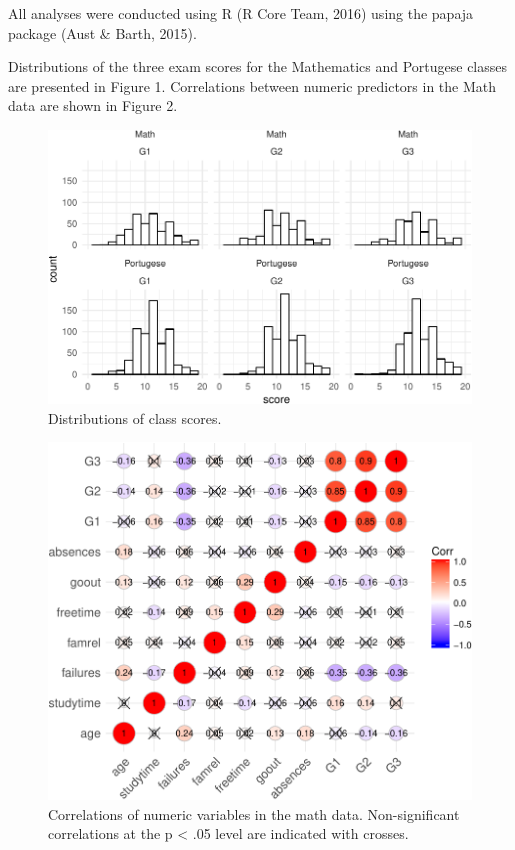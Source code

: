 \documentclass[english,floatsintext,man]{apa6}
\theoremstyle{definition}
\theoremstyle{definition}
\theoremstyle{definition}
\theoremstyle{remark}
\begin{document}
All analyses were conducted using R (R Core Team, 2016) using the papaja
package (Aust \& Barth, 2015).

Distributions of the three exam scores for the Mathematics and Portugese
classes are presented in Figure 1. Correlations between numeric
predictors in the Math data are shown in Figure 2.

\begin{figure}

{\centering \includegraphics[width=1\linewidth]{studentAPA_comp_files/figure-latex/fig1-1} 

}

\caption{Distributions of class scores.}\label{fig:fig1}
\end{figure}

\begin{figure}

{\centering \includegraphics[width=0.7\linewidth]{studentAPA_comp_files/figure-latex/fig2-1} 

}

\caption{Correlations of numeric variables in the math data. Non-significant correlations at the p < .05 level are indicated with crosses.}\label{fig:fig2}
\end{figure}
\end{document}

